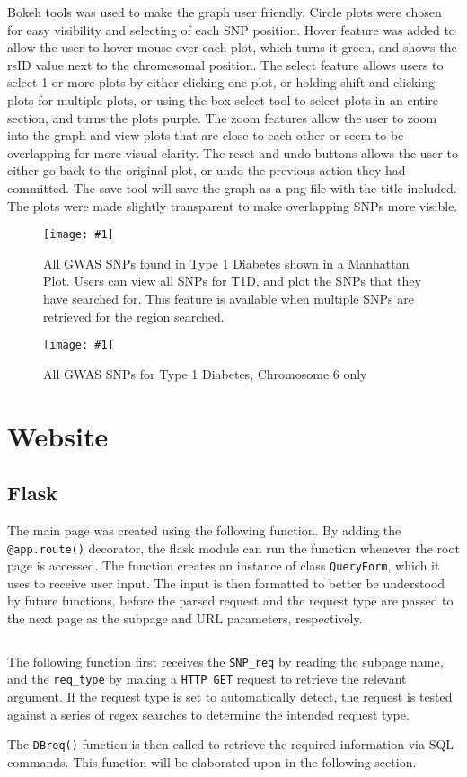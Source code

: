 \documentclass[12pt,a4paper]{article}
\newcommand{\mintfile}[1]{
\begin{tcolorbox}[colback=gray!5!white,%
	grow to left by=20mm,
    grow to right by=20mm,
    sharp corners]{{    \small \inputminted[breaklines]{python}{#1}		}}
\end{tcolorbox}}
\newcommand{\sect}[1]{
\clearpage
\hypertarget{#1}{
\section{#1}\label{#1}}
}
\newcommand{\subsect}[1]{
\FloatBarrier %
\hypertarget{#1}{
\subsection{#1}\label{#1}}
}
\newcommand{\pic}[2]{
\begin{figure}[h]
    \centering
    \captionsetup{justification=centering}
    \texttt{[image: \#1]}
    \caption{#2}
    \label{#1}
\end{figure}
}
\begin{document}
\mintfile{code_snippets/manPlot/createManPlot.py}
Bokeh tools was used to make the graph user friendly. Circle plots were chosen for easy visibility and selecting of each SNP position. Hover feature was added to allow the user to hover mouse over each plot, which turns it green, and shows the rsID value next to the chromosomal position. The select feature allows users to select 1 or more plots by either clicking one plot, or holding shift and clicking plots for multiple plots, or using the box select tool to select plots in an entire section, and turns the plots purple. The zoom features allow the user to zoom into the graph and view plots that are close to each other or seem to be overlapping for more visual clarity. The reset and undo buttons allows the user to either go back to the original plot, or undo the previous action they had committed. The save tool will save the graph as a png file with the title included. The plots were made slightly transparent to make overlapping SNPs more visible.

\pic{manplot1}{All GWAS SNPs found in Type 1 Diabetes shown in a Manhattan Plot.
Users can view all SNPs for T1D, and plot the SNPs that they have searched for.
This feature is available when multiple SNPs are retrieved for the region searched.}

\pic{manplot2}{All GWAS SNPs for Type 1 Diabetes, Chromosome 6 only}

\sect{Website}

\subsect{Flask}

The main page was created using the following function. By adding the \verb|@app.route()| decorator,
the flask module can run the function whenever the root page is accessed.
The function creates an instance of class \texttt{QueryForm}, which it uses to receive user input.
The input is then formatted to better be understood by future functions,
before the parsed request and the request type are passed to the next page as the subpage and URL parameters, respectively.

\mintfile{code_snippets/flask/root.py}

The following function first receives the \texttt{SNP\_req} by reading the subpage name,
and the \texttt{req\_type} by making a \texttt{HTTP GET} request to retrieve the relevant argument.
If the request type is set to automatically detect, the request is tested against a series of
regex searches to determine the intended request type.

The \texttt{DBreq()} function is then called to retrieve the required information via SQL commands. This function will be elaborated upon in the following section.
\end{document}
